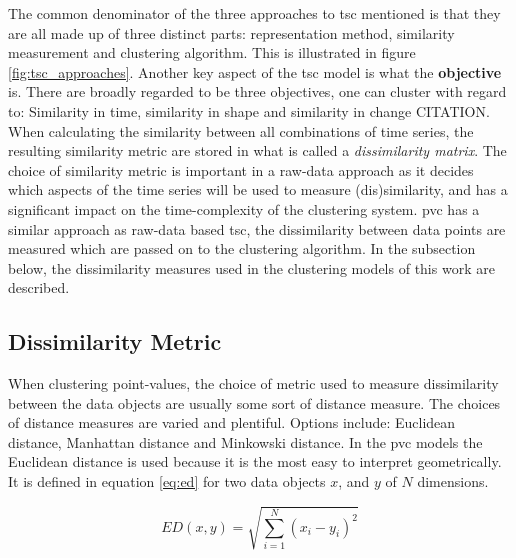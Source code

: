 The common denominator of the three approaches to \acrshort{tsc} mentioned is that they are all made up of three distinct parts: representation method, similarity measurement and clustering algorithm. This is illustrated in figure \ref{fig:tsc_approaches}. Another key aspect of the \acrshort{tsc} model is what the \textbf{objective} is. There are broadly regarded to be three objectives, one can cluster with regard to: Similarity in time, similarity in shape and similarity in change CITATION. When calculating the similarity between all combinations of time series, the resulting similarity metric are stored in what is called a \textit{dissimilarity matrix}. The choice of similarity metric is important in a raw-data approach as it decides which aspects of the time series will be used to measure (dis)similarity, and has a significant impact on the time-complexity of the clustering system. \acrshort{pvc} has a similar approach as raw-data based \acrshort{tsc}, the dissimilarity between data points are measured which are passed on to the clustering algorithm. In the subsection below, the dissimilarity measures used in the clustering models of this work are described.

\subsection{Dissimilarity Metric} \label{sec:theory_diss}
When clustering point-values, the choice of metric used to measure dissimilarity between the data objects are usually some sort of distance measure. The choices of distance measures are varied and plentiful. Options include: Euclidean distance, Manhattan distance and Minkowski distance. In the \acrshort{pvc} models the Euclidean distance is used because it is the most easy to interpret geometrically. It is defined in equation \eqref{eq:ed} for two data objects $x$, and $y$ of $N$ dimensions.

\begin{equation}
    ED(x,y) = \sqrt{\sum_{i = 1}^N (x_i - y_i)^2}
    \label{eq:ed}
\end{equation}

